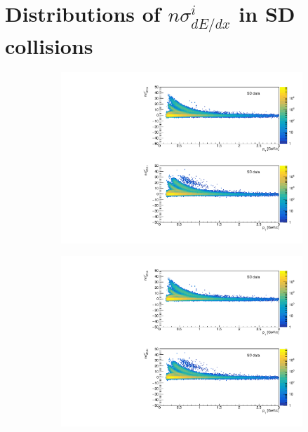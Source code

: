 
\chapter{Distributions of $n\sigma^{i}_{dE/dx}$ in SD collisions}\label{appendix:dEdxFits}

\begin{figure}[H]
	\centering
	\parbox{0.3\textwidth}{
		\centering
		\begin{subfigure}[b]{\linewidth}{
				{\includegraphics[width=\linewidth, page=2]{graphics/pid/spectraFit_SDT.pdf}}}
		\end{subfigure}
	}
	\quad
	\parbox{0.3\textwidth}{
		\centering
		\begin{subfigure}[b]{\linewidth}{
				{\includegraphics[width=\linewidth, page=3]{graphics/pid/spectraFit_SDT.pdf}}}

\end{subfigure}}
\end{figure}
